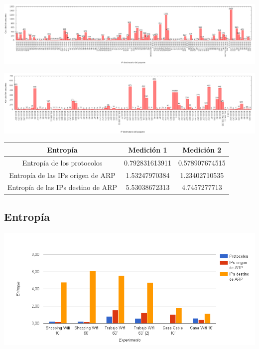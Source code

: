 \begin{center}
\includegraphics[width=16cm]{../mediciones/job1/dst.png}
\end{center}

\begin{center}
\includegraphics[width=16cm]{../mediciones/job2/dst.png}
\end{center}

\begin{center}
\begin{tabular}{|c||c|c|}
\hline
Entropía & Medición 1 & Medición 2 \\
\hline
Entropía de los protocolos & 0.792831613911 & 0.578907674515 \\
\hline
Entropía de las IPs origen de ARP & 1.53247970384 & 1.23402710535 \\
\hline
Entropía de las IPs destino de ARP & 5.53038672313 & 4.7457277713 \\
\hline
\end{tabular}
\end{center}





\subsection{Entropía}

\begin{center}
\includegraphics[width=14cm]{../mediciones/entropias.png}
\end{center}
